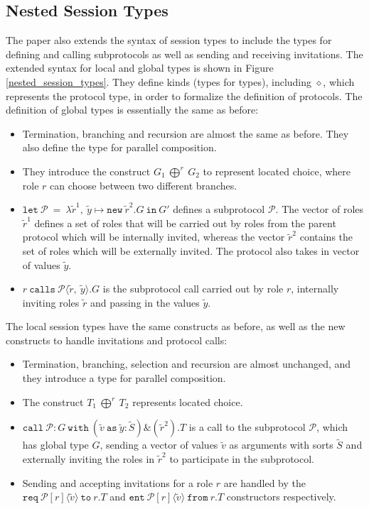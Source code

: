 \documentclass[12pt,twoside]{report}
\begin{document}
\subsection{Nested Session Types}\label{nested-session-types}
The paper also extends the syntax of session types to include the types for defining and calling subprotocols as well as sending and receiving invitations. The extended syntax for local and global types is shown in Figure \ref{nested_session_types}. They define kinds (types for types), including $\diamond$, which represents the protocol type, in order to formalize the definition of protocols. The definition of global types is essentially the same as before:
\begin{itemize}
    \item Termination, branching and recursion are almost the same as before. They also define the type for parallel composition.
    \item They introduce the construct $G_1\ \bigoplus^r\ G_2$ to represent located choice, where role $r$ can choose between two different branches. 
    \item $\texttt{let}\ \mathcal{P}\ =\ \lambda\widetilde{r}^1,\ \widetilde{y} \mapsto \texttt{new}\ \widetilde{r}^2.G\ \texttt{in}\ G'$ defines a subprotocol $\mathcal{P}$. The vector of roles $\widetilde{r}^1$ defines a set of roles that will be carried out by roles from the parent protocol which will be internally invited, whereas the vector $\widetilde{r}^2$ contains the set of roles which will be externally invited. The protocol also takes in vector of values $\widetilde{y}$.
    \item $r\ \texttt{calls}\ \mathcal{P}\langle \widetilde{r},\ \widetilde{y}\rangle.G$ is the subprotocol call carried out by role $r$, internally inviting roles $\widetilde{r}$ and passing in the values $\widetilde{y}$.
\end{itemize}{}

The local session types have the same constructs as before, as well as the new constructs to handle invitations and protocol calls:
\begin{itemize}
    \item Termination, branching, selection and recursion are almost unchanged, and they introduce a type for parallel composition. 
    \item The construct $T_1\ \bigoplus^r\ T_2$ represents located choice.
    \item $\texttt{call}\ \mathcal{P}:G\ \texttt{with}\ (\widetilde{v}\ \texttt{as}\ \widetilde{y}:\widetilde{S})\&(\widetilde{r}^2).T$ is a call to the subprotocol $\mathcal{P}$, which has global type $G$, sending a vector of values $\widetilde{v}$ as arguments with sorts $\widetilde{S}$ and externally inviting the roles in $\widetilde{r}^2$ to participate in the subprotocol.
    \item Sending and accepting invitations for a role $r$ are handled by the $\texttt{req}\ \mathcal{P}[r]\langle \widetilde{v} \rangle\ \texttt{to}\ r.T$ and $\texttt{ent}\ \mathcal{P}[r]\langle \widetilde{v} \rangle\ \texttt{from}\ r.T$ constructors respectively.
\end{itemize}{}
\end{document}
